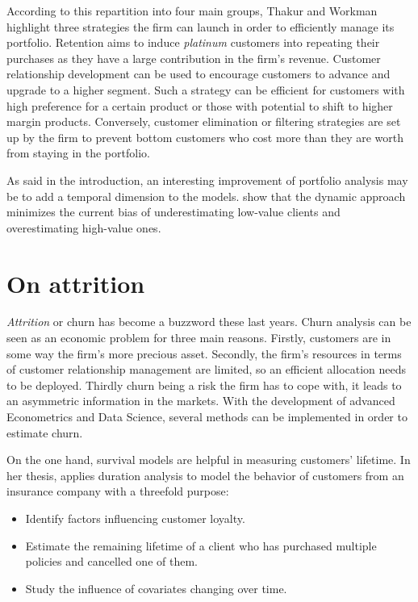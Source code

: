 \documentclass[
]{book}
\providecommand{\tightlist}{%
  \setlength{\itemsep}{0pt}\setlength{\parskip}{0pt}}
\begin{document}
According to this repartition into four main groups, Thakur and Workman highlight three strategies the firm can launch in order to efficiently manage its portfolio. Retention aims to induce \emph{platinum} customers into repeating their purchases as they have a large contribution in the firm's revenue. Customer relationship development can be used to encourage customers to advance and upgrade to a higher segment. Such a strategy can be efficient for customers with high preference for a certain product or those with potential to shift to higher margin products. Conversely, customer elimination or filtering strategies are set up by the firm to prevent bottom customers who cost more than they are worth from staying in the portfolio.

As said in the introduction, an interesting improvement of portfolio analysis may be to add a temporal dimension to the models. \citet{MANAGING_DYNAMICS_CUSTOMER_PORTFOLIO} show that the dynamic approach minimizes the current bias of underestimating low-value clients and overestimating high-value ones.

\hypertarget{attrition}{%
\section{On attrition}\label{attrition}}

\emph{Attrition} or churn has become a buzzword these last years. Churn analysis can be seen as an economic problem for three main reasons. Firstly, customers are in some way the firm's more precious asset. Secondly, the firm's resources in terms of customer relationship management are limited, so an efficient allocation needs to be deployed. Thirdly churn being a risk the firm has to cope with, it leads to an asymmetric information in the markets. With the development of advanced Econometrics and Data Science, several methods can be implemented in order to estimate churn.

On the one hand, survival models are helpful in measuring customers' lifetime. In her thesis, \citet{SURV_METHODS_INSURANCE} applies duration analysis to model the behavior of customers from an insurance company with a threefold purpose:

\begin{itemize}
\tightlist
\item
  Identify factors influencing customer loyalty.
\item
  Estimate the remaining lifetime of a client who has purchased multiple policies and cancelled one of them.
\item
  Study the influence of covariates changing over time.
\end{itemize}
\end{document}
